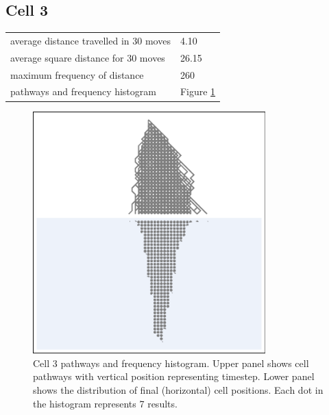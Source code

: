 \documentclass[11pt,a4paper]{article}
\newcommand \bt{\begin{longtable}{p{0.65\textwidth}p{0.25\textwidth}}}
\newcommand \et{\end{longtable}}
\begin{document}
\subsection*{Cell 3}
\bt
average distance travelled in 30 moves &  4.10\\
average square distance for 30 moves & 26.15\\
maximum frequency of distance & 260\\
pathways and frequency histogram & Figure \ref{fig3}
\et
\begin{figure}[htbp]
\begin{center}
\includegraphics[width=0.8\textwidth]{CA30_R40L40_3.eps}
\caption{Cell 3 pathways and frequency histogram. Upper panel shows cell pathways with vertical position representing timestep. 
Lower panel shows the distribution of final (horizontal) cell positions. Each dot in the histogram represents 7 results.}
\label{fig3}
\end{center}
\end{figure}
\end{document}
